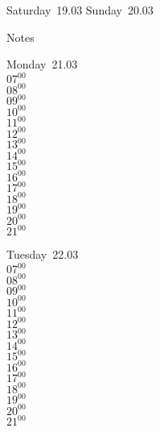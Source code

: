 \documentclass[11pt,a4paper]{book}\usepackage[]{graphicx}\usepackage[]{color}
\begin{document}
\begin{weekendbox}
  Saturday~19.03
  \tcblower
  Sunday~20.03
\end{weekendbox} %
\begin{notebox}
  Notes
\end{notebox}
\clearpage
\begin{headerbox}
\end{headerbox}
\begin{weekdaybox}
  Monday~21.03\\
  { 
  \vfill
  $07^{00}$\\
$08^{00}$\\
$09^{00}$\\
$10^{00}$\\
$11^{00}$\\
$12^{00}$\\
$13^{00}$\\
$14^{00}$\\
$15^{00}$\\
$16^{00}$\\
$17^{00}$\\
$18^{00}$\\
$19^{00}$\\
$20^{00}$\\
$21^{00}$\\
  }
\end{weekdaybox}
\begin{weekdaybox}
  Tuesday~22.03\\
  { 
  \vfill
  $07^{00}$\\
$08^{00}$\\
$09^{00}$\\
$10^{00}$\\
$11^{00}$\\
$12^{00}$\\
$13^{00}$\\
$14^{00}$\\
$15^{00}$\\
$16^{00}$\\
$17^{00}$\\
$18^{00}$\\
$19^{00}$\\
$20^{00}$\\
$21^{00}$\\
  }
\end{weekdaybox}
\end{document}
